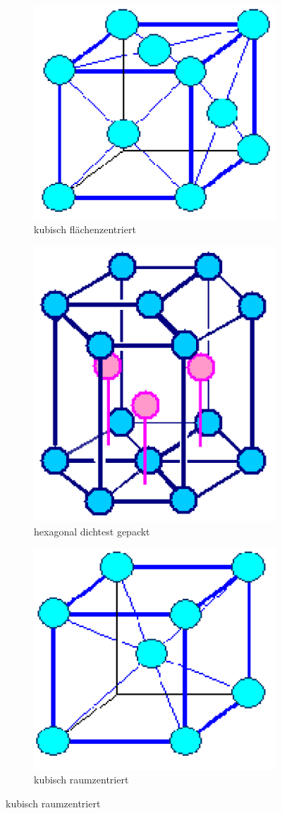 \begin{figure}[htbp]
	\begin{subfigure}{0.32\linewidth}
		\centering
		\includegraphics[width=0.5\linewidth]{images/1_kfz.png}
		\caption{kubisch flächenzentriert}
	\end{subfigure}
	\begin{subfigure}{0.32\linewidth}
		\centering
		\includegraphics[width=0.5\linewidth]{images/1_hcp.png}
		\caption{hexagonal dichtest gepackt}
	\end{subfigure}
	\begin{subfigure}{0.32\linewidth}
		\centering
		\includegraphics[width=0.5\linewidth]{images/1_krz.png}
		\caption{kubisch raumzentriert}
	\end{subfigure}
\end{figure}

